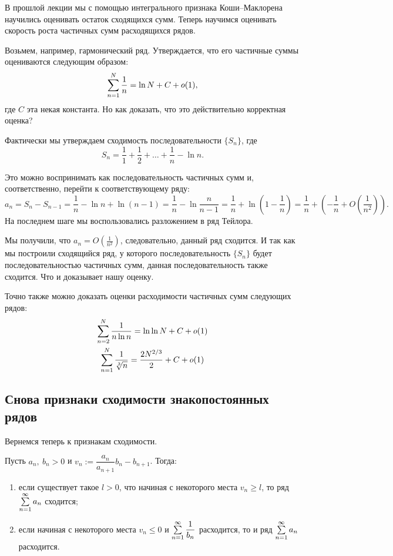 \documentclass[a4paper, 12pt]{article}
\begin{document}
В прошлой лекции мы с помощью интегрального признака Коши--Маклорена научились оценивать остаток сходящихся сумм. Теперь научимся оценивать скорость роста частичных сумм расходящихся рядов.

Возьмем, например, гармонический ряд. Утверждается, что его частичные суммы оцениваются следующим образом:
$$
\sum\limits_{n=1}^{N} \frac{1}{n} = \ln N + C + o(1),
$$
где $C$ эта некая константа. Но как доказать, что это действительно корректная оценка? 

Фактически мы утверждаем сходимость последовательности $\{S_n\}$, где
$$
S_n = \frac{1}{1} + \frac{1}{2} + \ldots + \frac{1}{n} - \ln n.
$$

Это можно воспринимать как последовательность частичных сумм и, соответственно, перейти к соответствующему ряду:
$$
a_n = S_n - S_{n-1} = \frac{1}{n} - \ln n + \ln(n-1) = \frac{1}{n} - \ln\frac{n}{n-1} = \frac{1}{n} + \ln\left(1 - \frac{1}{n}\right) = \frac{1}{n} + \left( - \frac{1}{n} + O\left(\frac{1}{n^2}\right) \right).
$$
На последнем шаге мы воспользовались разложением в ряд Тейлора.

Мы получили, что $a_n = O\left(\frac{1}{n^2}\right)$, следовательно, данный ряд сходится. И так как мы построили сходящийся ряд, у которого последовательность $\{ S_n\}$ будет последовательностью частичных сумм, данная последовательность также сходится. Что и доказывает нашу оценку.

Точно также можно доказать оценки расходимости частичных сумм следующих рядов:
\begin{gather*}
\sum\limits_{n=2}^{N} \frac{1}{n\ln n} = \ln \ln N + C + o(1) \\
\sum\limits_{n=1}^{N} \frac{1}{\sqrt[3]{n}} = \frac{2N^{2/3}}{2} + C + o(1) 
\end{gather*}

\subsection{Снова признаки сходимости знакопостоянных рядов}
Вернемся теперь к признакам сходимости. 
\begin{Test}
Пусть $a_n,\ b_n > 0$ и $v_n := \dfrac{a_n}{a_{n+1}}b_n - b_{n+1}$. Тогда:
\begin{enumerate}
\item если существует такое $l > 0$, что начиная с некоторого места $v_n \geq l$, то ряд $\sum\limits_{n=1}^{\infty}a_n$ сходится;
\item если начиная с некоторого места $v_n \leq 0$ и $\sum\limits_{n=1}^{\infty}\dfrac{1}{b_n}$ расходится, то и ряд $\sum\limits_{n=1}^{\infty}a_n$ расходится.
\end{enumerate}
\end{Test}
\end{document}
